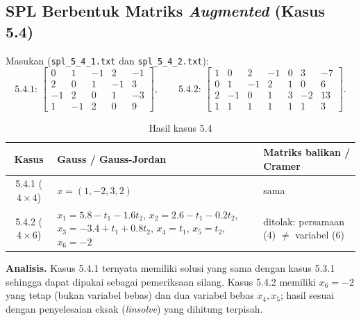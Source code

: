 \documentclass[12pt,a4paper]{article}
\begin{document}
\subsection{SPL Berbentuk Matriks \textit{Augmented} (Kasus 5.4)}
Masukan (\texttt{spl\_5\_4\_1.txt} dan \texttt{spl\_5\_4\_2.txt}):
\[
\text{5.4.1: }\left[\begin{array}{rrrr|r}0&1&-1&2&-1\\2&0&1&-1&3\\-1&2&0&1&-3\\1&-1&2&0&9\end{array}\right],\qquad
\text{5.4.2: }\left[\begin{array}{rrrrrr|r}1&0&2&-1&0&3&-7\\0&1&-1&2&1&0&6\\2&-1&0&1&3&-2&13\\1&1&1&1&1&1&3\end{array}\right].
\]
\begin{table}[H]
\centering\small
\renewcommand{\arraystretch}{1.25}
\begin{tabular}{@{}cp{5.2cm}p{6cm}@{}}
\toprule
\textbf{Kasus} & \textbf{Gauss / Gauss-Jordan} & \textbf{Matriks balikan / Cramer}\\
\midrule
5.4.1 ($4\times4$) & $x=(1,-2,3,2)$ & sama\\
5.4.2 ($4\times6$) &
 $x_1=5.8-t_1-1.6t_2$, $x_2=2.6-t_1-0.2t_2$, $x_3=-3.4+t_1+0.8t_2$, $x_4=t_1$, $x_5=t_2$, $x_6=-2$ &
 ditolak: persamaan (4) $\neq$ variabel (6)\\
\bottomrule
\end{tabular}
\caption{Hasil kasus 5.4}
\end{table}
\textbf{Analisis.} Kasus 5.4.1 ternyata memiliki solusi yang sama dengan kasus 5.3.1 sehingga dapat dipakai sebagai pemeriksaan silang. Kasus 5.4.2 memiliki $x_6=-2$ yang tetap (bukan variabel bebas) dan dua variabel bebas $x_4,x_5$; hasil sesuai dengan penyelesaian eksak (\textit{linsolve}) yang dihitung terpisah.
\end{document}

